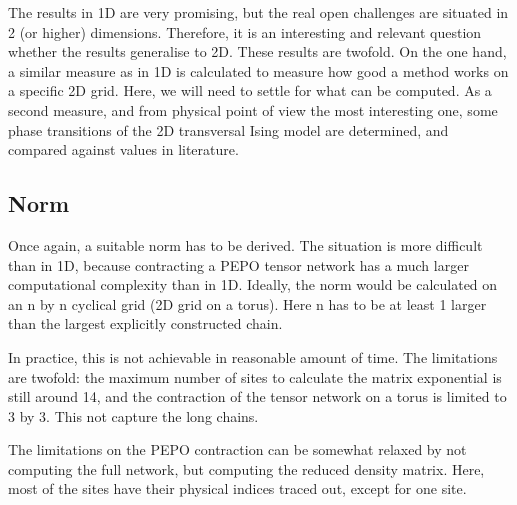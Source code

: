 The results in 1D are very promising, but the real open challenges are situated in 2 (or higher) dimensions. Therefore, it is an interesting and relevant question whether the results generalise to 2D. These results are twofold. On the one hand, a similar measure as in 1D is calculated to measure how good a method works on a specific 2D grid. Here, we will need to settle for what can be computed. As a second measure, and from physical point of view the most interesting one, some phase transitions of the 2D transversal Ising model are determined, and compared against values in literature.

\subsection{Norm}

Once again, a suitable norm has to be derived. The situation is more difficult than in 1D, because contracting a PEPO tensor network has a much larger computational complexity than in 1D. Ideally, the norm would be calculated on an n by n cyclical grid (2D grid on a torus). Here n has to be at least 1 larger than the largest explicitly constructed chain.

In practice, this is not achievable in reasonable amount of time. The limitations are twofold: the maximum number of sites to calculate the matrix exponential is still around 14, and the contraction of the tensor network on a torus is limited to 3 by 3. This not capture the long chains.

The limitations on the PEPO contraction can be somewhat relaxed by not computing the full network, but computing the reduced density matrix. Here, most of the sites have their physical indices traced out, except for one site.

